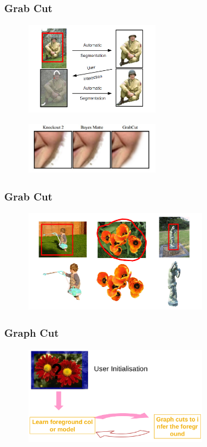 \documentclass[notheorems,mathserif,table,compress]{beamer}  %
\begin{document}
\begin{frame}
\frametitle{Grab Cut}
  \begin{figure}[!ht]
  \centering
   \includegraphics[width=2.2in]{soilder.png}
   \end{figure}
  \begin{figure}[!ht]
  \centering
   \includegraphics[width=2.2in]{matting.png}
   \end{figure}
\end{frame}

\begin{frame}
\frametitle{Grab Cut}
  \begin{figure}[!ht]
  \centering
   \includegraphics[width=3.0in]{flower2.png}
   \end{figure}
\end{frame}

\begin{frame}
\frametitle{Graph Cut}
  \begin{figure}[!ht]
  \centering
   \includegraphics[width=3.0in]{flower3.png}
   \end{figure}
\end{frame}
\end{document}
